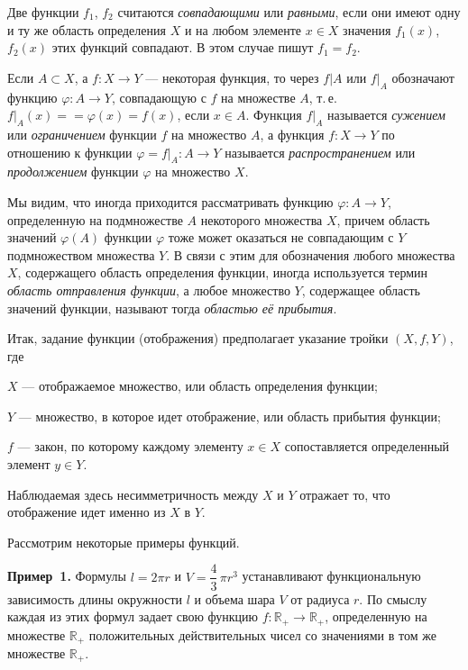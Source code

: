 Две функции $f_1$, $f_2$ считаются \textit{совпадающими} или \textit{равными}, если они имеют одну и ту же область определения $X$ и на любом элементе $x \in X$ значения
$f_1(x)$, $f_2(x)$ этих функций совпадают. В этом случае пишут $f_1 = f_2$.

Если $A \subset X$, а $f \colon X \to Y$ --- некоторая функция, то через $f|A$ или $f|_A$ обозначают функцию $\varphi \colon A \to Y$, совпадающую с $f$ на множестве $A$, т.\,е. $f|_A(x) =
{} = \varphi(x) = f(x)$, если $x \in A$. Функция $f|_A$ называется \textit{сужением} или \textit{ограничением} функции $f$ на множество $A$, а функция $f \colon X \to Y$ по отношению к функции
$\varphi = f|_A \colon A \to Y$ называется \textit{распространением} или \textit{продолжением} функции $\varphi$
на множество $X$.

Мы видим, что иногда приходится рассматривать функцию $\varphi \colon A \to Y$,
определенную на подмножестве $A$ некоторого множества $X$, причем область
значений $\varphi(A)$ функции $\varphi$ тоже может оказаться не совпадающим с $Y$
подмножеством множества $Y$. В связи с этим для обозначения любого множества $X$, содержащего область определения функции, иногда используется
термин \textit{область отправления функции}, а любое множество $Y$, содержащее
область значений функции, называют тогда \textit{областью её прибытия}.

Итак, задание функции (отображения) предполагает указание тройки
$(X, f, Y)$, где

$X$ --- отображаемое множество, или область определения функции;

$Y$ --- множество, в которое идет отображение, или область прибытия функции;

$f$ --- закон, по которому каждому элементу $x \in X$ сопоставляется определенный элемент $y \in Y$.

Наблюдаемая здесь несимметричность между $X$ и $Y$ отражает то, что
отображение идет именно из $X$ в $Y$.

Рассмотрим некоторые примеры функций.

\medskip

\textbf{Пример~1.} Формулы $l = 2\pi r$ и $V = \dfrac{4}{3}\,\pi r^3$ устанавливают функциональную
зависимость длины окружности $l$ и объема шара $V$ от радиуса $r$. По смыслу
каждая из этих формул задает свою функцию $f \colon \mathbb{R}_+ \to \mathbb{R}_+$, определенную на
множестве $\mathbb{R}_+$ положительных действительных чисел со значениями в том
же множестве $\mathbb{R}_+$.

